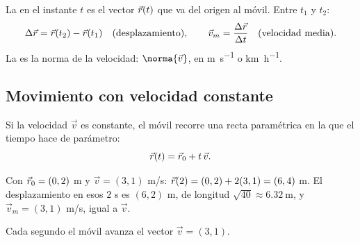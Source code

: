 \documentclass[11pt,a4paper]{article}
\begin{document}
\begin{definicion}
La  en el instante $t$ es el vector $\vec{r}(t)$ que va del origen al móvil. Entre $t_1$ y $t_2$:
\[ \Delta\vec{r}=\vec{r}(t_2)-\vec{r}(t_1)\quad\text{(desplazamiento)},\qquad
\vec v_m=\frac{\Delta\vec{r}}{\Delta t}\quad\text{(velocidad media)}. \]
La  es la norma de la velocidad: $\norma{\vec v}$, en \si{\metre\per\second} o \si{\kilo\metre\per\hour}.
\end{definicion}

\subsection{Movimiento con velocidad constante}
\begin{minipage}[c]{0.52\linewidth}
\begin{propiedad}
Si la velocidad $\vec v$ es constante, el móvil recorre una recta paramétrica en la que el tiempo hace de parámetro:
\[ \vec{r}(t)=\vec{r}_0+t\,\vec v . \]
\end{propiedad}
\begin{ejemplo}
Con $\vec{r}_0=(0,2)$ m y $\vec v=(3,1)$ m/s:
$\vec{r}(2)=(0,2)+2(3,1)=(6,4)$ m. El desplazamiento en esos $2$ s es $(6,2)$ m, de longitud
$\sqrt{40}\approx\SI{6.32}{\metre}$, y $\vec v_m=(3,1)$ m/s, igual a $\vec v$.
\end{ejemplo}
\end{minipage}\hfill
\begin{minipage}[c]{0.44\linewidth}\centering
{}

{\small\color{zmute}Cada segundo el móvil avanza el vector $\vec v=(3,1)$.}
\end{minipage}
\end{document}
